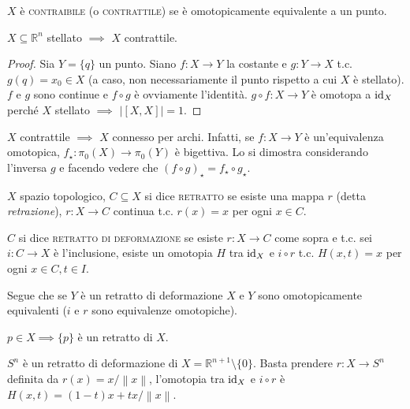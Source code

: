 \begin{defn}
  $X$ è \textsc{contraibile} (o \textsc{contrattile}) se è omotopicamente equivalente a un punto.
\end{defn}

\begin{prop}
  $X \subseteq \mathbb{R}^n$ stellato $\implies$ $X$ contrattile.
\end{prop}

\begin{proof}
  Sia $Y=\{q\}$ un punto. Siano $f: X \longrightarrow Y$ la costante e $g:Y \longrightarrow X$ t.c. $g(q)=x_0 \in X$ (a caso, non necessariamente il punto rispetto a cui $X$ è stellato). $f$ e $g$ sono continue e $f \circ g$ è ovviamente l'identità. $g \circ f:X \longrightarrow Y$ è omotopa a $\operatorname{id}_X$ perché $X$ stellato $\implies$ $\left|[X, X]\right|=1$.
\end{proof}

\begin{oss}
  $X$ contrattile $\implies$ $X$ connesso per archi. Infatti, se $f:X \longrightarrow Y$ è un'equivalenza omotopica, $f_{\star}: \pi_0(X) \longrightarrow \pi_0(Y)$ è bigettiva. Lo si dimostra considerando l'inversa $g$ e facendo vedere che $(f \circ g)_{\star}=f_{\star} \circ g_{\star}$.
\end{oss}

\begin{defn}
  $X$ spazio topologico, $C \subseteq X$ si dice \textsc{retratto} se esiste una mappa $r$ (detta \textit{retrazione}), $r:X \longrightarrow C$ continua t.c. $r(x)=x$ per ogni $x \in C$.

  $C$ si dice \textsc{retratto di deformazione} se esiste $r:X \longrightarrow C$ come sopra e t.c. sei $i:C \longrightarrow X$ è l'inclusione, esiste un omotopia $H$ tra $\operatorname{id}_X$ e $i \circ r$ t.c. $H(x, t)=x$ per ogni $x \in C, t \in I$.
\end{defn}

Segue che se $Y$ è un retratto di deformazione $X$ e $Y$ sono omotopicamente equivalenti ($i$ e $r$ sono equivalenze omotopiche).

\begin{ex}
  $p \in X \implies \{p\}$ è un retratto di $X$.
\end{ex}

\begin{ex}
  $S^n$ è un retratto di deformazione di $X=\mathbb{R}^{n+1} \setminus \{0\}$. Basta prendere $r: X \longrightarrow S^n$ definita da $r(x)=x/\left\|x\right\|$, l'omotopia tra $\operatorname{id}_X$ e $i \circ r$ è $H(x, t)=(1-t)x+tx/\left\|x\right\|$.
\end{ex}

